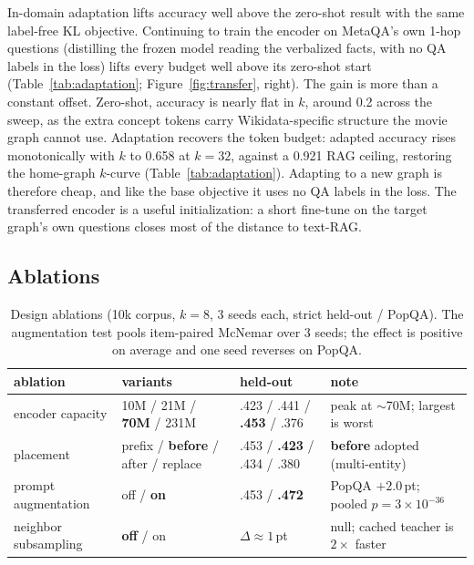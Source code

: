 \documentclass{article}
\newcommand{\popqa}{PopQA}
\begin{document}
In-domain adaptation lifts accuracy well above the zero-shot result with the same label-free KL
objective. Continuing to train the encoder on MetaQA's own 1-hop questions (distilling the
frozen model reading the verbalized facts, with no QA labels in the loss) lifts every budget
well above its zero-shot start (Table~\ref{tab:adaptation}; Figure~\ref{fig:transfer}, right). The
gain is more than a constant offset. Zero-shot, accuracy is nearly flat in $k$, around 0.2
across the sweep, as the extra concept tokens carry Wikidata-specific structure the movie graph
cannot use. Adaptation recovers the token budget: adapted accuracy rises monotonically with $k$
to 0.658 at $k{=}32$, against a 0.921 RAG ceiling, restoring the home-graph $k$-curve
(Table~\ref{tab:adaptation}). Adapting to a new graph is therefore cheap, and like the base
objective it uses no QA labels in the loss. The transferred encoder is a useful initialization:
a short fine-tune on the target graph's own questions closes most of the distance to text-RAG.

\subsection{Ablations}

\begin{table}[t]
  \caption{Design ablations (10k corpus, $k{=}8$, 3 seeds each, strict held-out / \popqa{}).
  The augmentation test pools item-paired McNemar over 3 seeds; the effect is positive on
  average and one seed reverses on \popqa{}.}
  \label{tab:ablations}
  \centering
  \small
  \begin{tabular}{llll}
    \toprule
    ablation & variants & held-out & note\\
    \midrule
    encoder capacity & 10M / 21M / \textbf{70M} / 231M & .423 / .441 / \textbf{.453} / .376 & peak at $\sim$70M; largest is worst\\
    placement & prefix / \textbf{before} / after / replace & .453 / \textbf{.423} / .434 / .380 & \textbf{before} adopted (multi-entity)\\
    prompt augmentation & off / \textbf{on} & .453 / \textbf{.472} & \popqa{} $+2.0$\,pt; pooled $p{=}3{\times}10^{-36}$\\
    neighbor subsampling & \textbf{off} / on & $\Delta \approx 1$\,pt & null; cached teacher is $2\times$ faster\\
    \bottomrule
  \end{tabular}
\end{table}
\end{document}
